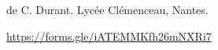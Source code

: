 \nRessources de C. Durant. Lycée Clémenceau, Nantes.
\begin{center}
\end{center}

\url{https://forms.gle/iATEMMKfh26mNXRi7}

